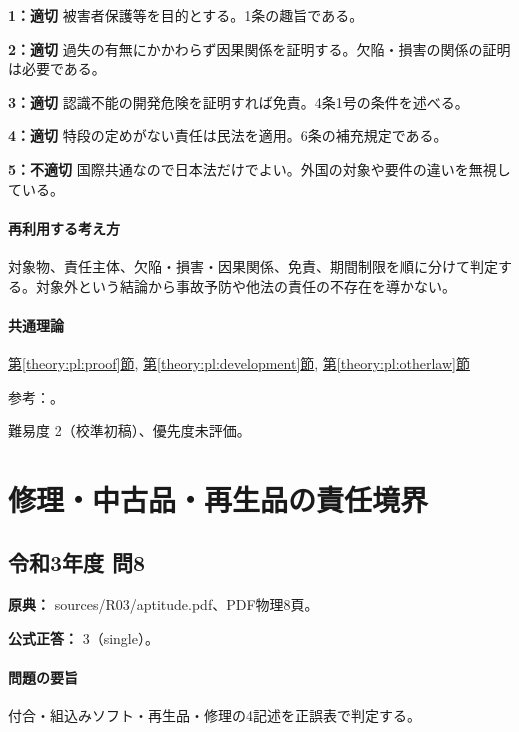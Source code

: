\noindent\textbf{1：適切} 被害者保護等を目的とする。1条の趣旨である。\par

\noindent\textbf{2：適切} 過失の有無にかかわらず因果関係を証明する。欠陥・損害の関係の証明は必要である。\par

\noindent\textbf{3：適切} 認識不能の開発危険を証明すれば免責。4条1号の条件を述べる。\par

\noindent\textbf{4：適切} 特段の定めがない責任は民法を適用。6条の補充規定である。\par

\noindent\textbf{5：不適切} 国際共通なので日本法だけでよい。外国の対象や要件の違いを無視している。\par

\paragraph{再利用する考え方} 対象物、責任主体、欠陥・損害・因果関係、免責、期間制限を順に分けて判定する。対象外という結論から事故予防や他法の責任の不存在を導かない。

\paragraph{共通理論} \hyperref[theory:pl:proof]{第\ref*{theory:pl:proof}節}, \hyperref[theory:pl:development]{第\ref*{theory:pl:development}節}, \hyperref[theory:pl:otherlaw]{第\ref*{theory:pl:otherlaw}節}

\par 参考：\cite{pl_statute,pl_qa,pl_definitions2018}。

\par 難易度 2（校準初稿）、優先度未評価。

\section{修理・中古品・再生品の責任境界}

\subsection{令和3年度 問8}
\label{q:r03-reg-apt-08}

\noindent\textbf{原典：} sources/R03/aptitude.pdf、PDF物理8頁。

\textbf{公式正答：} 3（single）。

\paragraph{問題の要旨} 付合・組込みソフト・再生品・修理の4記述を正誤表で判定する。

